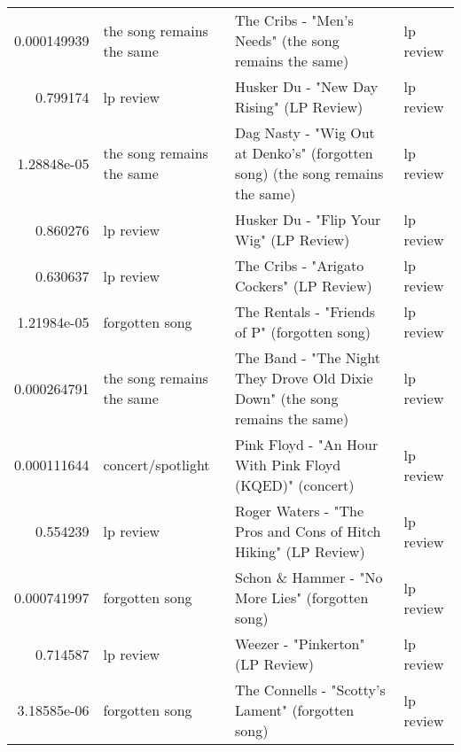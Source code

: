 \documentclass[letterpaper,10pt]{article}
\begin{document}
\begin{table}[H]
\begin{adjustbox}{max width=\linewidth}
\begin{tabular}{rlll}
  0.000149939 & the song remains the same & The Cribs - "Men's Needs"  (the song remains the same)                                                       & lp review                 \\
  0.799174    & lp review                 & Husker Du - "New Day Rising" (LP Review)                                                                     & lp review                 \\
  1.28848e-05 & the song remains the same & Dag Nasty - "Wig Out at Denko's" (forgotten song) (the song remains the same)                                & lp review                 \\
  0.860276    & lp review                 & Husker Du - "Flip Your Wig" (LP Review)                                                                      & lp review                 \\
  0.630637    & lp review                 & The Cribs - "Arigato Cockers" (LP Review)                                                                    & lp review                 \\
  1.21984e-05 & forgotten song            & The Rentals - "Friends of P" (forgotten song)                                                                & lp review                 \\
  0.000264791 & the song remains the same & The Band - "The Night They Drove Old Dixie Down" (the song remains the same)                                 & lp review                 \\
  0.000111644 & concert/spotlight         & Pink Floyd - "An Hour With Pink Floyd (KQED)" (concert)                                                      & lp review                 \\
  0.554239    & lp review                 & Roger Waters - "The Pros and Cons of Hitch Hiking" (LP Review)                                               & lp review                 \\
  0.000741997 & forgotten song            & Schon \& Hammer - "No More Lies" (forgotten song)                                                             & lp review                 \\
  0.714587    & lp review                 & Weezer - "Pinkerton" (LP Review)                                                                             & lp review                 \\
  3.18585e-06 & forgotten song            & The Connells - "Scotty's Lament"  (forgotten song)                                                           & lp review                 \\

\end{tabular}
\end{adjustbox}
\end{table}
\end{document}
